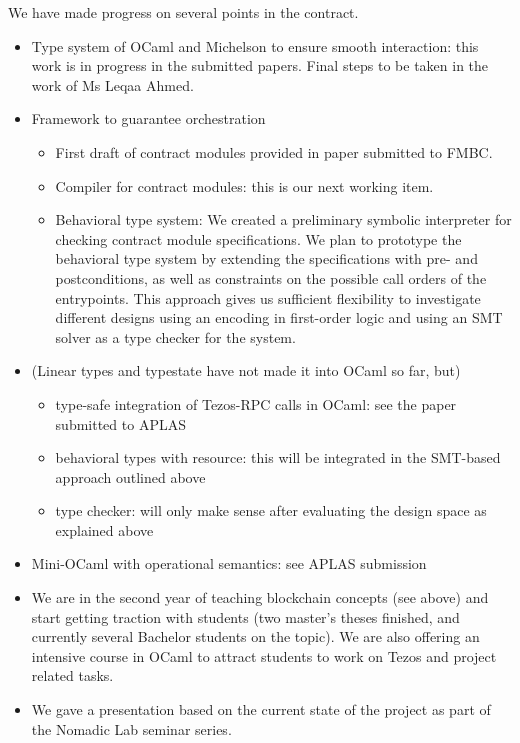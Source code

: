 \documentclass[a4paper,11pt]{article}
\begin{document}
We have made progress on several points in the contract.
\begin{itemize}
\item Type system of OCaml and Michelson to ensure smooth interaction: this work is in progress in the submitted papers. Final steps to be taken in the work of Ms Leqaa Ahmed.
\item Framework to guarantee orchestration
  \begin{itemize}
  \item First draft of contract modules provided in paper submitted to FMBC.
  \item Compiler for contract modules: this is our next working item.
  \item Behavioral type system:
    We created a preliminary symbolic interpreter for checking contract module specifications. We plan to prototype the behavioral type system by extending the specifications with pre- and postconditions, as well as constraints on the possible call orders of the entrypoints. This approach gives us sufficient flexibility to investigate different designs using an encoding in first-order logic and using an SMT solver as a type checker for the system. 
  \end{itemize}
\item (Linear types and typestate have not made it into OCaml so far, but)
  \begin{itemize}
  \item type-safe integration of Tezos-RPC calls in OCaml: see the paper submitted to APLAS
  \item behavioral types with resource: this will be integrated in the SMT-based approach outlined above
  \item type checker: will only make sense after evaluating the design space as explained above
  \end{itemize}
\item Mini-OCaml with operational semantics: see APLAS submission
\item We are in the second year of teaching blockchain concepts (see above) and start getting traction with students (two master's theses finished, and currently  several Bachelor students on the topic). We are also offering an intensive course in OCaml to attract students to work on Tezos and project related tasks.
\item We gave a presentation based on the current state of the project as part of the Nomadic Lab seminar series.
\end{itemize}
\end{document}
